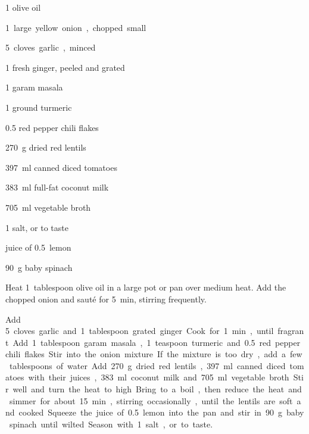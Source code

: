 \label{recipe:red_lentil_dahl}

\begin{ingredients}
\item \SI{1}{\tablespoon} olive oil
\item \SI{1} large yellow onion, chopped small
\item \SI{5} cloves garlic, minced
\item \SI{1}{\tablespoon} fresh ginger, peeled and grated
\item \SI{1}{\tablespoon} garam masala
\item \SI{1}{\teaspoon} ground turmeric
\item \SI{0.5}{\teaspoon} red pepper chili flakes
\item \SI{270}{\gram} dried red lentils
\item \SI{397}{\milli\litre} canned diced tomatoes
\item \SI{383}{\milli\litre} full-fat coconut milk
\item \SI{705}{\milli\litre} vegetable broth
\item \SI{1}{\teaspoon} salt, or to taste
\item juice of \SI{0.5} lemon
\item \SI{90}{\gram} baby spinach
\end{ingredients}

\begin{method}
Heat \SI{1}{tablespoon} olive oil in a large pot or pan over medium heat. Add the chopped onion and sauté for \SI{5}{\minute}, stirring frequently.

Add \SI{5} cloves garlic and \SI{1}{tablespoon} grated ginger. Cook for \SI{1}{\minute}, until fragrant.

Add \SI{1}{tablespoon} garam masala, \SI{1}{teaspoon} turmeric and \SI{0.5}{\teaspoon} red pepper chili flakes. Stir into the onion mixture. If the mixture is too dry, add a few tablespoons of water.

Add \SI{270}{\gram} dried red lentils, \SI{397}{\milli\litre} canned diced tomatoes with their juices, \SI{383}{\milli\litre} coconut milk and \SI{705}{\milli\litre} vegetable broth. Stir well and turn the heat to high. Bring to a boil, then reduce the heat and simmer for about \SI{15}{\minute}, stirring occasionally, until the lentils are soft and cooked.

Squeeze the juice of \SI{0.5} lemon into the pan and stir in \SI{90}{\gram} baby spinach until wilted. Season with \SI{1}{\teaspoon} salt, or to taste.


\end{method}


